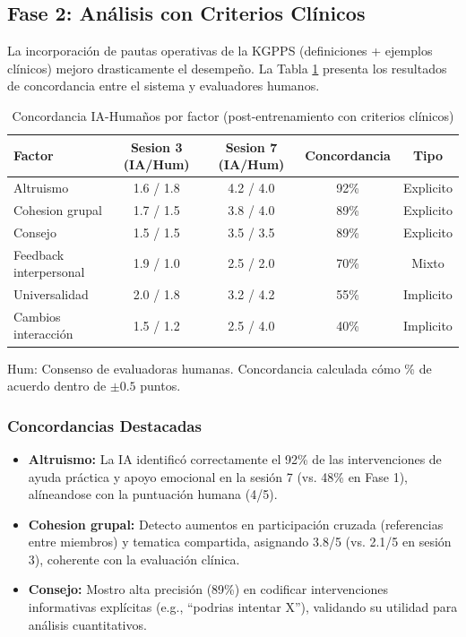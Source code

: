 \documentclass[12pt,a4paper,twoside]{book}
\begin{document}
\subsection{Fase 2: Análisis con Criterios Clínicos}

La incorporación de pautas operativas de la KGPPS (definiciones + ejemplos clínicos) mejoro drasticamente el desempeño. La Tabla \ref{tab:concordancia_clínico} presenta los resultados de concordancia entre el sistema y evaluadores humanos.

\begin{table}[h]
\centering
\caption{Concordancia IA-Humaños por factor (post-entrenamiento con criterios clínicos)}
\label{tab:concordancia_clínico}
\begin{tabular}{lcccc}
\toprule
\textbf{Factor} & \textbf{Sesion 3 (IA/Hum)} & \textbf{Sesion 7 (IA/Hum)} & \textbf{Concordancia} & \textbf{Tipo} \\
\midrule
Altruismo & 1.6 / 1.8 & 4.2 / 4.0 & 92\% & Explicito \\
Cohesion grupal & 1.7 / 1.5 & 3.8 / 4.0 & 89\% & Explicito \\
Consejo & 1.5 / 1.5 & 3.5 / 3.5 & 89\% & Explicito \\
Feedback interpersonal & 1.9 / 1.0 & 2.5 / 2.0 & 70\% & Mixto \\
Universalidad & 2.0 / 1.8 & 3.2 / 4.2 & 55\% & Implicito \\
Cambios interacción & 1.5 / 1.2 & 2.5 / 4.0 & 40\% & Implicito \\
\bottomrule
\end{tabular}
\par\smallskip
\footnotesize{Hum: Consenso de evaluadoras humanas. Concordancia calculada cómo \% de acuerdo dentro de $\pm 0.5$ puntos.}
\end{table}

\subsubsection{Concordancias Destacadas}

\begin{itemize}
    \item \textbf{Altruismo:} La IA identificó correctamente el 92\% de las intervenciones de ayuda práctica y apoyo emocional en la sesión 7 (vs. 48\% en Fase 1), alíneandose con la puntuación humana (4/5).
    
    \item \textbf{Cohesion grupal:} Detecto aumentos en participación cruzada (referencias entre miembros) y tematica compartida, asignando 3.8/5 (vs. 2.1/5 en sesión 3), coherente con la evaluación clínica.
    
    \item \textbf{Consejo:} Mostro alta precisión (89\%) en codificar intervenciones informativas explícitas (e.g., ``podrias intentar X''), validando su utilidad para análisis cuantitativos.
\end{itemize}
\end{document}
